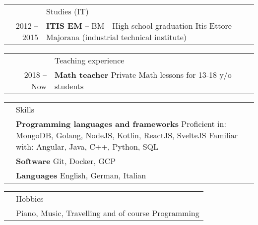 \documentclass[letterpaper, 11pt]{article}
\newcommand{\header}{\Large\color{RedOrange}}
\newenvironment{SectionTable}[1]{
	\renewcommand*{\arraystretch}{1.7}
	\setlength{\tabcolsep}{10pt}
	\begin{longtable}{Rp{5.2in}} & #1 \\}
{\end{longtable}\vspace{-.3cm}}
\newenvironment{SectionTableSingleSpace}[1]{
	\renewcommand*{\arraystretch}{1.2}
	\setlength{\tabcolsep}{10pt}
	\begin{longtable}{Rp{5.2in}} & #1 \\[0.6em]}
{\end{longtable}\vspace{-.3cm}}
\begin{document}
\begin{SectionTableSingleSpace}{\header Studies (IT)}
2012 -- 2015 & 
\textbf{ITIS EM} -- BM - High school graduation  \newline
Itis Ettore Majorana (industrial technical institute) \\

\end{SectionTableSingleSpace}

\begin{SectionTable}{\header Teaching experience}
2018 -- Now &
\textbf{Math teacher} Private Math lessons for 13-18 y/o students \newline
\end{SectionTable}
\begin{SectionTable}{\header Skills}
& \textbf{Programming languages and frameworks} \newline
Proficient in: MongoDB, Golang, NodeJS, Kotlin, ReactJS, SvelteJS \newline
Familiar with: Angular, Java, C++, Python, SQL  \\

& \textbf{Software} \newline
Git, Docker, GCP \\

& \textbf{Languages} \newline
English, German, Italian
\end{SectionTable}

\begin{SectionTable}{\header Hobbies}
& Piano, Music, Travelling and of course Programming 
\end{SectionTable}
\end{document}
